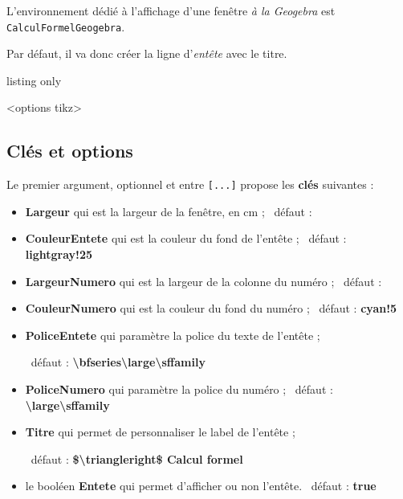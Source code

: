 \documentclass[french,a4paper,11pt]{article}
\newcommand\Cle[1]{{\bfseries\sffamily\textlangle #1\textrangle}}
\begin{document}
\begin{cautionblock}
L'environnement dédié à l'affichage d'une fenêtre \textit{à la Geogebra} est \texttt{CalculFormelGeogebra}.

Par défaut, il va donc créer la ligne d'\textit{entête} avec le titre.
\end{cautionblock}

\begin{PresentationCode}{listing only}
\begin{CalculFormelGeogebra}<options tikz>
\end{CalculFormelGeogebra}
\end{PresentationCode}

\begin{PresentationCode}{}
\begin{CalculFormelGeogebra}
\end{CalculFormelGeogebra}
\end{PresentationCode}

\subsection{Clés et options}

\begin{tipblock}
Le premier argument, optionnel et entre \texttt{[...]} propose les \Cle{clés} suivantes :

\begin{itemize}
	\item \Cle{Largeur} qui est la largeur de la fenêtre, en cm ; \hfill~défaut : \Cle{10}
	\item \Cle{CouleurEntete} qui est la couleur du fond de l'entête ; \hfill~défaut : \Cle{lightgray!25}
	\item \Cle{LargeurNumero} qui est la largeur de la colonne du numéro ; \hfill~défaut : \Cle{1}
	\item \Cle{CouleurNumero} qui est la couleur du fond du numéro ; \hfill~défaut : \Cle{cyan!5}
	\item \Cle{PoliceEntete} qui paramètre la police du texte de l'entête  ;
	
	\hfill~défaut : \Cle{\textbackslash bfseries\textbackslash large\textbackslash sffamily}
	\item \Cle{PoliceNumero} qui paramètre la police du numéro  ; \hfill~défaut : \Cle{\textbackslash large\textbackslash sffamily}
	\item \Cle{Titre} qui permet de personnaliser le label de l'entête ;
	
	\hfill~défaut : \Cle{\$\textbackslash triangleright\$ Calcul formel}
	\item le booléen \Cle{Entete} qui permet d'afficher ou non l'entête. \hfill~défaut : \Cle{true}
\end{itemize}
\vspace*{-\baselineskip}\leavevmode
\end{tipblock}
\end{document}
